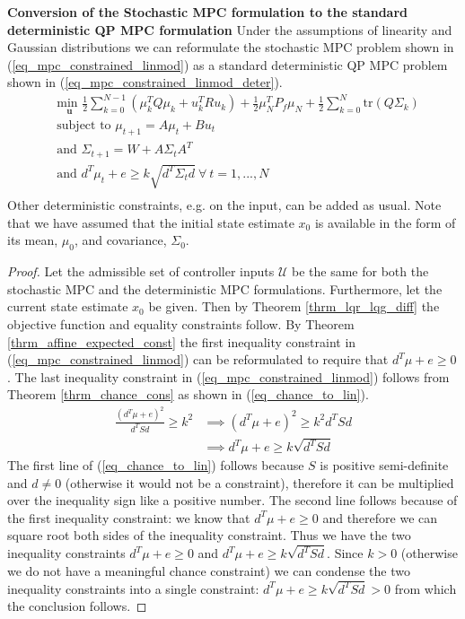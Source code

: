 \begin{thrm}
\textbf{Conversion of the Stochastic MPC formulation to the standard deterministic QP MPC formulation} Under the assumptions of linearity and Gaussian distributions we can reformulate the stochastic MPC problem shown in (\ref{eq_mpc_constrained_linmod}) as a standard deterministic QP MPC problem shown in (\ref{eq_mpc_constrained_linmod_deter}).
\begin{equation}
\begin{aligned}
&\underset{\mathbf{u}}{\text{min }} \frac{1}{2}\sum_{k=0}^{N-1} \left( \mu_k^TQ\mu_k + u_k^TRu_k \right) + \frac{1}{2}\mu_N^TP_f\mu_N + \frac{1}{2}\sum_{k=0}^N \text{tr}(Q\Sigma_k) \\
& \text{subject to } \mu_{t+1}=A\mu_t + Bu_t \\
& \text{and } \Sigma_{t+1} = W+A\Sigma_t A^T \\
& \text{and } d^T\mu_t + e \geq k\sqrt{d^T \Sigma_t d} ~\forall ~t=1,...,N\\
\end{aligned}
\label{eq_mpc_constrained_linmod_deter}
\end{equation}
\label{thrm_mpc_stoch_to_det}
Other deterministic constraints, e.g. on the input, can be added as usual. Note that we have assumed that the initial state estimate $x_0$ is available in the form of its mean, $\mu_0$,  and covariance, $\Sigma_0$.
\end{thrm}
\begin{proof}
Let the admissible set of controller inputs $\mathcal{U}$ be the same for both the stochastic MPC and the deterministic MPC formulations. Furthermore, let the current state estimate $x_0$ be given. Then by Theorem \ref{thrm_lqr_lqg_diff} the objective function and equality constraints follow. By Theorem \ref{thrm_affine_expected_const} the first inequality constraint in (\ref{eq_mpc_constrained_linmod}) can be reformulated to require that $d^T\mu + e \geq 0$. The last inequality constraint in (\ref{eq_mpc_constrained_linmod}) follows from Theorem \ref{thrm_chance_cons} as shown in (\ref{eq_chance_to_lin}).
\begin{equation}
\begin{aligned}
\frac{(d^T\mu+e)^2}{d^TSd} \geq k^2 &\implies (d^T\mu+e)^2 \geq k^2 {d^TSd} \\
&\implies d^T\mu+e \geq k \sqrt{d^TSd}
\end{aligned}
\label{eq_chance_to_lin}
\end{equation}
The first line of (\ref{eq_chance_to_lin}) follows because $S$ is positive semi-definite and $d \neq 0$ (otherwise it would not be a constraint), therefore it can be multiplied over the inequality sign like a positive number. The second line follows because of the first inequality constraint: we know that $d^T\mu+e \geq 0$ and therefore we can square root both sides of the inequality constraint. Thus we have the two inequality constraints $d^T\mu+e \geq 0$ and $d^T\mu+e \geq k \sqrt{d^TSd}$. Since $k > 0$ (otherwise we do not have a meaningful chance constraint) we can condense the two inequality constraints into a single constraint: $d^T\mu+e \geq k \sqrt{d^TSd} > 0$ from which the conclusion follows.  
\end{proof}
